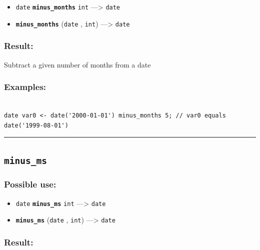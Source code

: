 \documentclass[]{book}
\providecommand{\tightlist}{%
  \setlength{\itemsep}{0pt}\setlength{\parskip}{0pt}}
\theoremstyle{definition}
\theoremstyle{definition}
\theoremstyle{definition}
\theoremstyle{remark}
\begin{document}
\begin{itemize}
\tightlist
\item
  \texttt{date} \textbf{\texttt{minus\_months}} \texttt{int}
  ---\textgreater{} \texttt{date}
\item
  \textbf{\texttt{minus\_months}} (\texttt{date} , \texttt{int})
  ---\textgreater{} \texttt{date}
\end{itemize}

\subsubsection{Result:}\label{result-345}

Subtract a given number of months from a date

\subsubsection{Examples:}\label{examples-246}

\begin{verbatim}
 
date var0 <- date('2000-01-01') minus_months 5; // var0 equals date('1999-08-01')
\end{verbatim}

\begin{center}\rule{0.5\linewidth}{\linethickness}\end{center}

\subsection{\texorpdfstring{\texttt{minus\_ms}}{minus\_ms}}\label{minus_ms}

\subsubsection{Possible use:}\label{possible-use-357}

\begin{itemize}
\tightlist
\item
  \texttt{date} \textbf{\texttt{minus\_ms}} \texttt{int}
  ---\textgreater{} \texttt{date}
\item
  \textbf{\texttt{minus\_ms}} (\texttt{date} , \texttt{int})
  ---\textgreater{} \texttt{date}
\end{itemize}

\subsubsection{Result:}\label{result-346}
\end{document}
